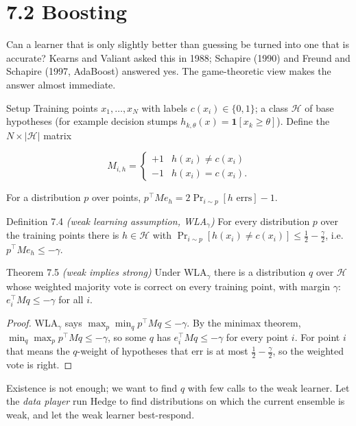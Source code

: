 \documentclass[11pt,a4paper,openany]{book}
\newcommand{\ind}{\mathbf{1}}
\newcommand{\abs}[1]{\lvert #1\rvert}
\begin{document}
\section*{7.2 Boosting}\label{ch7-boost}

Can a learner that is only slightly better than guessing be turned into one that is accurate? Kearns and Valiant asked this in 1988; Schapire (1990) and Freund and Schapire (1997, AdaBoost) answered yes. The game-theoretic view makes the answer almost immediate.

\begin{bdef}{Setup}
Training points $x_1,\dots,x_N$ with labels $c(x_i)\in\{0,1\}$; a class $\mathcal H$ of base hypotheses (for example decision stumps $h_{k,\theta}(x)=\ind[x_k\ge\theta]$). Define the $N\times\abs{\mathcal H}$ matrix

\[M_{i,h}=\begin{cases}+1&h(x_i)\neq c(x_i)\\-1&h(x_i)=c(x_i).\end{cases}\]

For a distribution $p$ over points, $p^\top Me_h=2\Pr_{i\sim p}[h\text{ errs}]-1$.
\end{bdef}

\begin{bdef}{Definition 7.4 \emph{(weak learning assumption, WLA$_\gamma$)}}
For every distribution $p$ over the training points there is $h\in\mathcal H$ with $\Pr_{i\sim p}[h(x_i)\neq c(x_i)]\le\frac12-\frac\gamma2$, i.e. $p^\top Me_h\le-\gamma$.
\end{bdef}

\begin{bthm}{Theorem 7.5 \emph{(weak implies strong)}}
Under WLA$_\gamma$ there is a distribution $q$ over $\mathcal H$ whose weighted majority vote is correct on every training point, with margin $\gamma$: $e_i^\top Mq\le-\gamma$ for all $i$.
\end{bthm}

\begin{proof}
WLA$_\gamma$ says $\max_p\min_qp^\top Mq\le-\gamma$. By the minimax theorem, $\min_q\max_pp^\top Mq\le-\gamma$, so some $q$ has $e_i^\top Mq\le-\gamma$ for every point $i$. For point $i$ that means the $q$-weight of hypotheses that err is at most $\frac12-\frac\gamma2$, so the weighted vote is right.
\end{proof}

Existence is not enough; we want to find $q$ with few calls to the weak learner. Let the \emph{data player} run Hedge to find distributions on which the current ensemble is weak, and let the weak learner best-respond.
\end{document}
